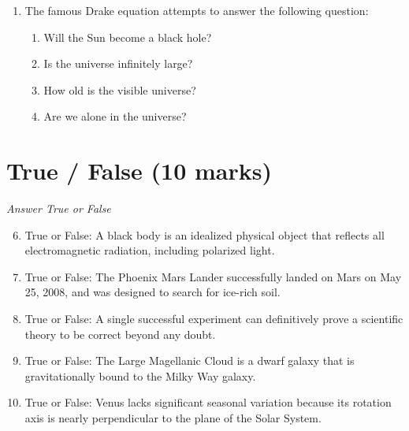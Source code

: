 \documentclass[12pt]{article}
\begin{document}
\begin{enumerate}[label=\arabic*.]
\begin{enumerate}[label=(\alph*)]
    \item Mars does not have enough internal heat to drive the greenhouse effect
    \item Mars is too far from the sun for the greenhouse effect to work
    \item the greenhouse effect requires an ozone layer which Mars does not have
    \item the atmosphere on Mars is too thin to trap a significant amount of heat
\end{enumerate}
\item The famous Drake equation attempts to answer the following question:
\begin{enumerate}[label=(\alph*)]
    \item Will the Sun become a black hole?
    \item Is the universe infinitely large?
    \item How old is the visible universe?
    \item Are we alone in the universe?
\end{enumerate}
\end{enumerate}

\section*{True / False (10 marks)}
\textit{Answer True or False}
\begin{enumerate}[label=\arabic*.]
\setcounter{enumi}{5}
\item True or False: A black body is an idealized physical object that reflects all electromagnetic radiation, including polarized light.
\item True or False: The Phoenix Mars Lander successfully landed on Mars on May 25, 2008, and was designed to search for ice-rich soil.
\item True or False: A single successful experiment can definitively prove a scientific theory to be correct beyond any doubt.
\item True or False: The Large Magellanic Cloud is a dwarf galaxy that is gravitationally bound to the Milky Way galaxy.
\item True or False: Venus lacks significant seasonal variation because its rotation axis is nearly perpendicular to the plane of the Solar System.
\end{enumerate}
\end{document}

